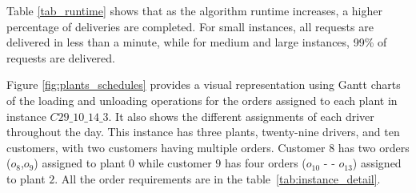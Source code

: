 \documentclass{article}
\begin{document}
Table \ref{tab_runtime} shows that as the algorithm runtime increases, a higher percentage of deliveries are completed. For small instances, all requests are delivered in less than a minute, while for medium and large instances, 99\% of requests are delivered. 

\begin{table}[htb]
    \centering
    \caption{RMC delivery completion within different runtimes of the GRASP}
    \label{tab_runtime}
    \scriptsize
\end{table}
    
Figure \ref*{fig:plants_schedules} provides a visual representation using Gantt charts of the loading and unloading operations for the orders assigned to each plant in instance $C29\_10\_14\_3$. It also shows the different assignments of each driver throughout the day. This instance has three plants, twenty-nine drivers, and ten customers, with two customers having multiple orders. Customer $8$ has two orders ($o_8$,$o_9$) assigned to plant $0$ while customer $9$ has four orders ($o_{10}$ - - $o_{13}$) assigned to plant $2$. All the order requirements are in the table~\ref*{tab:instance_detail}.

\begin{table}[!h]
    \centering
    \caption{Informations of instance $C29\_10\_14\_3$}
    \label{tab:instance_detail}
\end{table}
\end{document}
